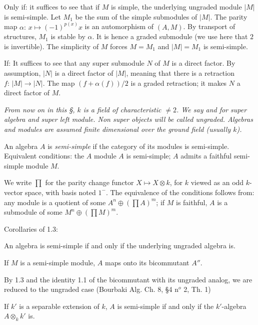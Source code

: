 Only if: it suffices to see that if  $M$ is simple, the
underlying ungraded module $\vert M\vert$ is
semi-simple.
Let $M_1$ be the sum of the simple submodules of $\vert
M\vert$.
The parity map $\alpha\colon\,x\mapsto(-1)^{p(x)}x$ is
an automorphism of $(A,M)$.
By transport of structures, $M_1$ is stable by $\alpha$.
It is hence a graded submodule (we use here that $2$ is
invertible).
The simplicity of $M$ forces $M=M_1$ and $\vert
M\vert=M_1$ is semi-simple.
\enddemo

If: It suffices to see that any super submodule $N$ of $M$
is a direct factor.
By assumption, $\vert N\vert$ is a direct factor of
$\vert M\vert$, meaning that there is a retraction
$f\colon\,\vert M\vert\to\vert N\vert$.
The map $(f+\alpha(f))/2$ is a graded retraction; it
makes $N$ a direct factor of $M$.

{\it From now on in this {\rm \S}, $k$ is a field of
characteristic $\not=2$.
We say  and  for
super algebra and super left module.
Non super objects will be called ungraded.
Algebras and modules are assumed finite dimensional
over the ground field {\rm (}usually $k${\rm )}.}

\endsubhead
An algebra $A$ is {\it semi-simple} if the category of
its modules is semi-simple.
Equivalent conditions: the $A$ module $A$ is
semi-simple; $A$ admits a faithful semi-simple module
$M$.

We write $\prod$ for the parity change functor
$X\mapsto X\otimes k$, for $k$ viewed as an odd
$k$-vector space, with basis noted $1^-$.
The equivalence of the conditions follows from:
any module is a quotient of some $A^n\oplus\left(\prod
A\right)^m$; if $M$ is faithful, $A$ is a submodule of
some $M^n\oplus\left(\prod M\right)^m$.
\enddemo

Corollaries of 1.3:

An algebra is semi-simple if and only if the underlying
ungraded algebra is.
\endproclaim

If $M$ is a semi-simple module, $A$ maps onto its
bicommutant $A''$.
\endproclaim

By 1.3 and the identity 1.1 of the bicommutant with its
ungraded analog, we are reduced to the ungraded case
(Bourbaki Alg. Ch. 8, \S4 n$^o$ 2, Th. 1)

If $k'$ is a separable extension of $k$, $A$ is
semi-simple if and only if the $k'$-algebra $A\otimes_k
k'$ is.
\endproclaim

